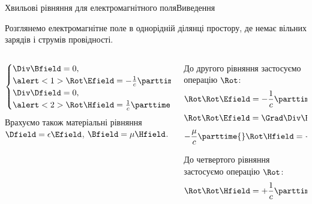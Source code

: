 \documentclass[onlytextwidth]{beamer}
\begin{document}
\begin{frame}{Хвильові рівняння для електромагнітного поля}{Виведення}
	\begin{block}{}\justifying
		Розглянемо електромагнітне поле в однорідній ділянці простору, де немає вільних зарядів і струмів провідності.
	\end{block}
	\begin{columns}
		\begin{column}{0.45\linewidth}
			\begin{block}{}\justifying
				\begin{equation*}
					\begin{cases}
						\Div\Bfield = 0,                                     \\
						\alert<1>{\Rot\Efield = -\frac1c\parttime{\Bfield}}, \\
						\Div\Dfield = 0,                                     \\
						\alert<2>{\Rot\Hfield = \frac1c\parttime{\Dfield}}.
					\end{cases}
				\end{equation*}
				Врахуємо також матеріальні рівняння $\Dfield = \epsilon\Efield$, $\Bfield = \mu\Hfield$.
			\end{block}
		\end{column}
		\quad
		\begin{column}{0.55\linewidth}
			\begin{overprint}
				\begin{block}{}
					До другого рівняння застосуємо операцію $\Rot$:
					\begin{equation*}
						\Rot\Rot\Efield = - \frac1c \parttime{} \Rot\Bfield.
					\end{equation*}
					\begin{equation*}
						\Rot\Rot\Efield =\Grad\Div\Efield - \nabla^2\Efield.
					\end{equation*}
					\begin{equation*}
						- \frac{\mu}c \parttime{}\Rot\Hfield = - \frac{\epsilon\mu}{c^2}\pparttime{\Efield}  .
					\end{equation*}
				\end{block}
				\begin{block}{}
					До четвертого рівняння застосуємо операцію $\Rot$:
					\begin{equation*}
						\Rot\Rot\Hfield = + \frac1c \parttime{} \Rot\Dfield.
					\end{equation*}

\end{block}
\end{overprint}
\end{column}
\end{columns}
\end{frame}
\end{document}
